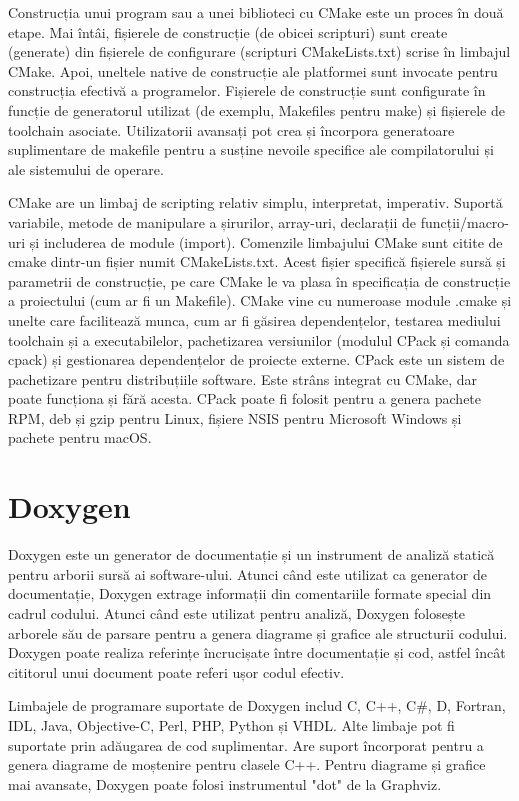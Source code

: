 \documentclass[a4paper,12pt]{report}
\begin{document}
Construcția unui program sau a unei biblioteci cu CMake este un proces în două etape. Mai întâi, fișierele de construcție (de obicei scripturi) sunt create (generate) din fișierele de configurare (scripturi CMakeLists.txt) scrise în limbajul CMake. Apoi, uneltele native de construcție ale platformei sunt invocate pentru construcția efectivă a programelor. Fișierele de construcție sunt configurate în funcție de generatorul utilizat (de exemplu, Makefiles pentru make) și fișierele de toolchain asociate. Utilizatorii avansați pot crea și încorpora generatoare suplimentare de makefile pentru a susține nevoile specifice ale compilatorului și ale sistemului de operare.

CMake are un limbaj de scripting relativ simplu, interpretat, imperativ. Suportă variabile, metode de manipulare a șirurilor, array-uri, declarații de funcții/macro-uri și includerea de module (import). Comenzile limbajului CMake sunt citite de cmake dintr-un fișier numit CMakeLists.txt. Acest fișier specifică fișierele sursă și parametrii de construcție, pe care CMake le va plasa în specificația de construcție a proiectului (cum ar fi un Makefile). CMake vine cu numeroase module .cmake și unelte care facilitează munca, cum ar fi găsirea dependențelor, testarea mediului toolchain și a executabilelor, pachetizarea versiunilor (modulul CPack și comanda cpack) și gestionarea dependențelor de proiecte externe. CPack este un sistem de pachetizare pentru distribuțiile software. Este strâns integrat cu CMake, dar poate funcționa și fără acesta. CPack poate fi folosit pentru a genera pachete RPM, deb și gzip pentru Linux, fișiere NSIS pentru Microsoft Windows și pachete pentru macOS.

\section{Doxygen}
Doxygen este un generator de documentație și un instrument de analiză statică pentru arborii sursă ai software-ului. Atunci când este utilizat ca generator de documentație, Doxygen extrage informații din comentariile formate special din cadrul codului. Atunci când este utilizat pentru analiză, Doxygen folosește arborele său de parsare pentru a genera diagrame și grafice ale structurii codului. Doxygen poate realiza referințe încrucișate între documentație și cod, astfel încât cititorul unui document poate referi ușor codul efectiv.

Limbajele de programare suportate de Doxygen includ C, C++, C\#, D, Fortran, IDL, Java, Objective-C, Perl, PHP, Python și VHDL. Alte limbaje pot fi suportate prin adăugarea de cod suplimentar. Are suport încorporat pentru a genera diagrame de moștenire pentru clasele C++. Pentru diagrame și grafice mai avansate, Doxygen poate folosi instrumentul "dot" de la Graphviz.
\end{document}
